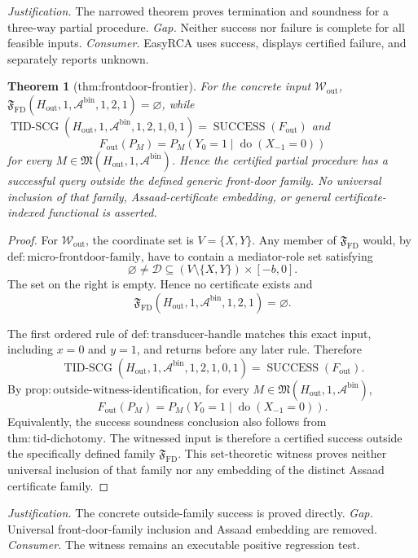 \documentclass{article}
\newtheorem{theorem}{Theorem}
\begin{document}
\par\smallskip\noindent \textit{Justification.} The narrowed theorem proves termination and soundness for a three-way partial procedure. \textit{Gap.} Neither success nor failure is complete for all feasible inputs. \textit{Consumer.} EasyRCA uses success, displays certified failure, and separately reports unknown.

\begin{theorem}[thm:frontdoor-frontier]\label{thm:frontdoor-frontier}
For the concrete input \(\mathcal W_{\mathrm{out}}\), \(\mathfrak F_{\mathrm{FD}}(H_{\mathrm{out}},1,\mathcal A^{\mathrm{bin}},1,2,1)=\varnothing\), while \(\operatorname{TID\text{-}SCG}(H_{\mathrm{out}},1,\mathcal A^{\mathrm{bin}},1,2,1,0,1)=\operatorname{SUCCESS}(F_{\mathrm{out}})\) and
\[
 F_{\mathrm{out}}(P_M)=P_M(Y_0=1\mid\operatorname{do}(X_{-1}=0))
\]
for every \(M\in\mathfrak M(H_{\mathrm{out}},1,\mathcal A^{\mathrm{bin}})\).  Hence the certified partial procedure has a successful query outside the defined generic front-door family.  No universal inclusion of that family, Assaad-certificate embedding, or general certificate-indexed functional is asserted.
\end{theorem}
\begin{proof}
For \(\mathcal W_{\mathrm{out}}\), the coordinate set is \(V=\{X,Y\}\).  Any member of \(\mathfrak F_{\mathrm{FD}}\) would, by \(\mathrm{def:micro\text{-}frontdoor\text{-}family}\), have to contain a mediator-role set satisfying
\[
 \varnothing\ne\mathcal D
 \subseteq(V\setminus\{X,Y\})\times[-b,0].
\]
The set on the right is empty.  Hence no certificate exists and
\[
 \mathfrak F_{\mathrm{FD}}(H_{\mathrm{out}},1,\mathcal A^{\mathrm{bin}},1,2,1)
 =\varnothing.
\]

The first ordered rule of \(\mathrm{def:transducer\text{-}handle}\) matches this exact input, including \(x=0\) and \(y=1\), and returns before any later rule.  Therefore
\[
 \operatorname{TID\text{-}SCG}(H_{\mathrm{out}},1,
 \mathcal A^{\mathrm{bin}},1,2,1,0,1)
 =\operatorname{SUCCESS}(F_{\mathrm{out}}).
\]
By \(\mathrm{prop:outside\text{-}witness\text{-}identification}\), for every \(M\in\mathfrak M(H_{\mathrm{out}},1,\mathcal A^{\mathrm{bin}})\),
\[
 F_{\mathrm{out}}(P_M)
 =P_M(Y_0=1\mid\operatorname{do}(X_{-1}=0)).
\]
Equivalently, the success soundness conclusion also follows from \(\mathrm{thm:tid\text{-}dichotomy}\).  The witnessed input is therefore a certified success outside the specifically defined family \(\mathfrak F_{\mathrm{FD}}\).  This set-theoretic witness proves neither universal inclusion of that family nor any embedding of the distinct Assaad certificate family.
\end{proof}
\par\smallskip\noindent \textit{Justification.} The concrete outside-family success is proved directly. \textit{Gap.} Universal front-door-family inclusion and Assaad embedding are removed. \textit{Consumer.} The witness remains an executable positive regression test.
\end{document}

